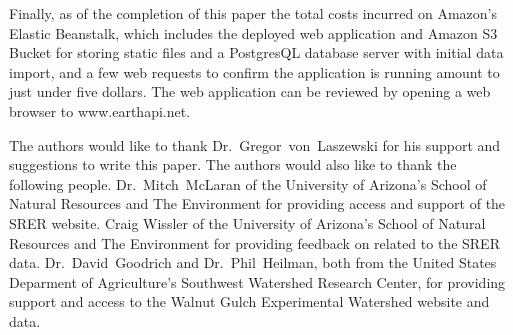 Finally, as of the completion of this paper the total costs incurred on 
Amazon's Elastic Beanstalk, which includes the deployed web application 
and Amazon S3 Bucket for storing static files and a PostgresQL database 
server with initial data import, and a few web requests to confirm the 
application is running amount to just under five dollars.  The web 
application can be reviewed by opening a web browser to www.earthapi.net.

\begin{acks}
The authors would like to thank Dr.~Gregor~von~Laszewski for his support 
and suggestions to write this paper.  The authors would also like to thank 
the following people.  Dr.~Mitch~McLaran of the University of Arizona's School 
of Natural Resources and The Environment for providing access and support of 
the SRER website.  Craig Wissler of the University of Arizona's School of 
Natural Resources and The Environment for providing feedback on related to the 
SRER data.  Dr.~David~Goodrich and Dr.~Phil~Heilman, both from the United 
States Deparment of Agriculture's Southwest Watershed Research Center, for 
providing support and access to the Walnut Gulch Experimental Watershed 
website and data.
\end{acks}


 
